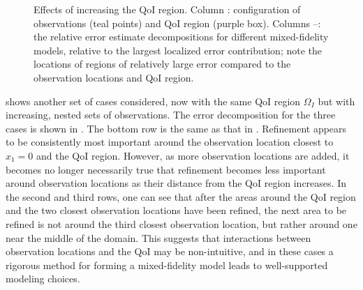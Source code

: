 \begin{figure}[htbp]
\centering
\captionsetup{justification=centering}
\captionsetup{justification=centering}
\captionsetup{justification=centering}
\captionsetup{justification=centering}
  \caption{Effects of increasing the QoI region. Column \protect{}: configuration of observations (teal points) and QoI region (purple box). Columns \protect{}--\protect{}: the relative error estimate decompositions for different mixed-fidelity models, relative to the largest localized error contribution; note the locations of regions of relatively large error compared to the observation locations and QoI region.}
  \label{fig:qoiStudy}
\end{figure}

 shows another set of cases considered, now with the same QoI region $\Omega_I$ but with increasing, nested sets of observations.
The error decomposition for the three cases is shown in . The bottom row is the same as that in . Refinement appears to be consistently most important around the observation location closest to $x_1=0$ and the QoI region. However, as more observation locations are added, it becomes no longer necessarily true that refinement becomes less important around observation locations as their distance from the QoI region increases. In the second and third rows, one can see that after the areas around the QoI region and the two closest observation locations have been refined, the next area to be refined is not around the third closest observation location, but rather around one near the middle of the domain. This suggests that interactions between observation locations and the QoI may be non-intuitive, and in these cases a rigorous method for forming a mixed-fidelity model leads to well-supported modeling choices.

